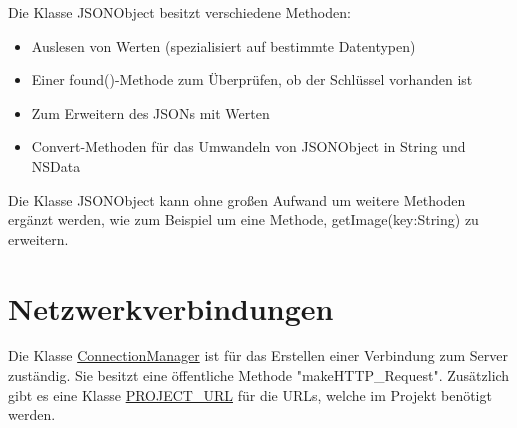 \documentclass[a4paper,10pt]{article}
\begin{document}
Die Klasse JSONObject besitzt verschiedene Methoden:
\begin{itemize}
\item Auslesen von Werten (spezialisiert auf bestimmte Datentypen)
\item Einer found()-Methode zum Überprüfen, ob der Schlüssel vorhanden ist
\item Zum Erweitern des JSONs mit Werten
\item Convert-Methoden für das Umwandeln von JSONObject in String und NSData
\end{itemize}

Die Klasse JSONObject kann ohne großen Aufwand um weitere Methoden ergänzt werden, wie zum Beispiel um eine Methode, getImage(key:String) zu erweitern.


\section{Netzwerkverbindungen}

Die Klasse \href{https://github.com/SECH-Tag-EEXCESS-Browser/iOSX-App/blob/master/Team%20Content/Demos/JSON/Sech/Sech/ConnectionManager.swift}{ConnectionManager} ist für das Erstellen einer Verbindung zum Server zuständig. Sie besitzt eine öffentliche Methode "makeHTTP\_Request".
 Zusätzlich gibt es eine Klasse \href{https://github.com/SECH-Tag-EEXCESS-Browser/iOSX-App/blob/master/Team%20Content/Demos/JSON/Sech/Sech/ConnectionManager.swift}{PROJECT\_URL} für die URLs, welche im Projekt benötigt werden.
\end{document}
